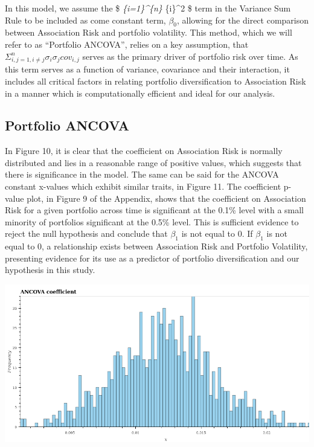 \documentclass[11pt]{article}
\makeatletter
\def\maxwidth{\ifdim\Gin@nat@width>\linewidth\linewidth
    \else\Gin@nat@width\fi}
\let\Oldincludegraphics\includegraphics
\renewcommand{\includegraphics}[1]{\Oldincludegraphics[width=.8\maxwidth]{#1}}
\makeatother
\begin{document}
In this model, we assume the \$ \sum\emph{\{i=1\}\^{}\{n\}
\sigma}\{i\}\^{}2 \$ term in the Variance Sum Rule to be included as
come constant term, \(\beta_{0}\), allowing for the direct comparison
between Association Risk and portfolio volatility. This method, which we
will refer to as ``Portfolio ANCOVA'', relies on a key assumption, that
\(\Sigma_{i,j=1, i \ne j}^{n} \sigma_{i} \sigma_{j} cov_{i,j}\) serves
as the primary driver of portfolio risk over time. As this term serves
as a function of variance, covariance and their interaction, it includes
all critical factors in relating portfolio diversification to
Association Risk in a manner which is computationally efficient and
ideal for our analysis.

\hypertarget{portfolio-ancova}{%
\subsection{Portfolio ANCOVA}\label{portfolio-ancova}}

In Figure 10, it is clear that the coefficient on Association Risk is
normally distributed and lies in a reasonable range of positive values,
which suggests that there is significance in the model. The same can be
said for the ANCOVA constant x-values which exhibit similar traits, in
Figure 11. The coefficient p-value plot, in Figure 9 of the Appendix,
shows that the coefficient on Association Risk for a given portfolio
across time is significant at the 0.1\% level with a small minority of
portfolios significant at the 0.5\% level. This is sufficient evidence
to reject the null hypothesis and conclude that \(\beta_{1}\) is not
equal to 0. If \(\beta_{1}\) is not equal to 0, a relationship exists
between Association Risk and Portfolio Volatility, presenting evidence
for its use as a predictor of portfolio diversification and our
hypothesis in this study.

\includegraphics{../experiments/media/Coefficeint value with constant accross portfolio.png}\\
\end{document}
